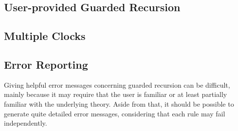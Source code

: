 \subsection{User-provided Guarded Recursion}

\subsection{Multiple Clocks}

\subsection{Error Reporting}
Giving helpful error messages concerning guarded recursion can be difficult,
mainly because it may require that the user is familiar or at least partially familiar
with the underlying theory. Aside from that, it should be possible to generate
quite detailed error messages, considering that each rule may fail independently.







